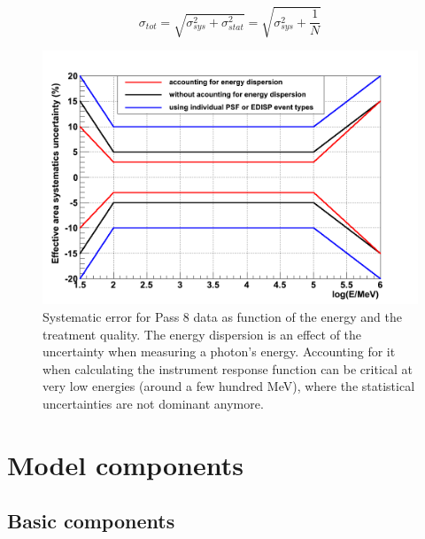 \begin{equation}
\sigma_{tot} =\sqrt{\sigma_{sys}^2 + \sigma_{stat}^2} = \sqrt{\sigma_{sys}^2 + \frac{1}{N}}
\end{equation}


\begin{figure}[h]
 \centering
 \includegraphics[width=.5\linewidth]{pic/method/LAT_sys_error.png}
 \caption{Systematic error for Pass 8 data as function of the energy and the treatment quality. The energy dispersion is an effect of the uncertainty when measuring a photon's energy. Accounting for it when calculating the instrument response function can be critical at very low energies (around a few hundred MeV), where the statistical uncertainties are not dominant anymore.}
 \label{fig:LAT_sys_err}
\end{figure}


\section{Model components}
\subsection{Basic components}

